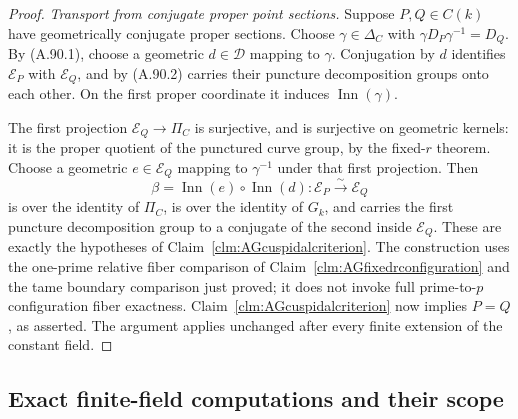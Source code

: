 \documentclass[11pt]{article}
\begin{document}
\begin{proof}
\emph{Transport from conjugate proper point sections.}
Suppose \(P,Q\in C(k)\) have geometrically conjugate
proper sections. Choose
\(\gamma\in\Delta_C\) with
\(\gamma D_P\gamma^{-1}=D_Q\).
By (A.90.1), choose a geometric
\(d\in\mathcal D\) mapping to \(\gamma\).
Conjugation by \(d\) identifies
\(\mathcal E_P\) with \(\mathcal E_Q\), and by
(A.90.2) carries their puncture decomposition groups
onto each other. On the first proper coordinate
it induces \(\operatorname{Inn}(\gamma)\).

The first projection
\(\mathcal E_Q\to\Pi_C\) is surjective, and is
surjective on geometric kernels: it is the proper
quotient of the punctured curve group, by the
fixed-\(r\) theorem. Choose a geometric
\(e\in\mathcal E_Q\) mapping to \(\gamma^{-1}\)
under that first projection. Then
\[
            \beta=\operatorname{Inn}(e)\circ
                         \operatorname{Inn}(d):
                 \mathcal E_P\xrightarrow{\sim}\mathcal E_Q
                                                        \tag{A.90.6}
\]
is over the identity of \(\Pi_C\), is over the
identity of \(G_k\), and carries the first puncture
decomposition group to a conjugate of the second
inside \(\mathcal E_Q\). These are exactly the
hypotheses of Claim~\ref{clm:AGcuspidalcriterion}.
The construction uses the one-prime relative fiber
comparison of Claim~\ref{clm:AGfixedrconfiguration}
and the tame boundary comparison just proved; it does
not invoke full prime-to-\(p\) configuration fiber
exactness. Claim~\ref{clm:AGcuspidalcriterion} now
implies \(P=Q\), as asserted. The argument applies
unchanged after every finite extension of the constant
field.
\end{proof}


\subsection{Exact finite-field computations and their scope}
\end{document}
